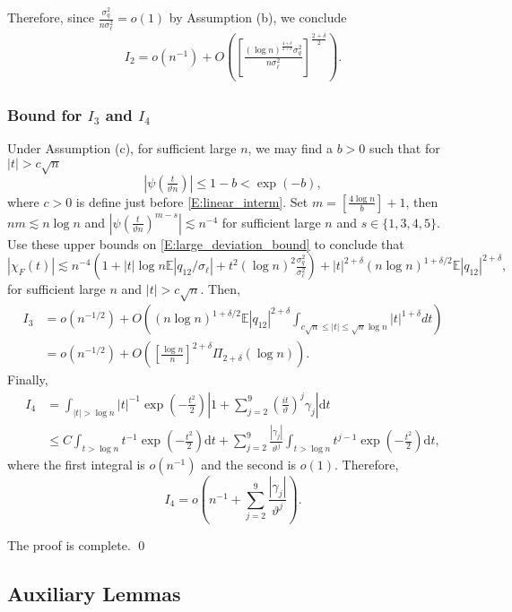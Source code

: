 \documentclass[11pt]{article}
\numberwithin{equation}{section}
\theoremstyle{definition}
\newcommand{\E}{\mathbb{E}}
\def\ls{\lesssim}
\def\d{\mathrm{d}}
\newcommand{\Scale}{\vartheta}
\begin{document}
Therefore, since $\tfrac{\sigma_q^2}{n\sigma_\ell^2} = o(1)$  by Assumption (b), we conclude
\begin{align*}
I_2 = o(n^{-1}) + O\left(\left[\frac{(\log n)^{\frac{4+\delta}{2+\delta}}\sigma_q^2}{n\sigma_\ell^2}\right]^{\tfrac{2+\delta}{2}}\right).
\end{align*}


\subsubsection*{Bound for $I_3$ and $I_4$}

Under Assumption (c),  for sufficient large $n$, we may find a $b>0$ such that for $|t|>c\sqrt{n}$
\[|\psi\left(\tfrac{t}{\Scale n}\right)|\leq 1-b<\exp(-b),\]
where $c>0$ is define just before  \eqref{E:linear_interm}. 
Set $m=[\tfrac{4\log n}{b}] + 1$, then $nm\ls n \log n$ and $|\psi\left(\tfrac{t}{\Scale n}\right)^{m-s}|\ls n^{-4}$ for sufficient large $n$ and $s\in\{1,3,4,5\}$. Use these upper bounds on \eqref{E:large_deviation_bound} to conclude that
\begin{equation} \label{E:cf_high}
|\chi_F(t)|\ls  n^{-4}\left(1 + |t|\log n \E|q_{12}/\sigma_\ell| + t^2(\log n)^2\tfrac{\sigma_q^2}{\sigma_\ell^2} \right) +  	|t|^{2+\delta}(n\log n)^{1+\delta/2}\E|q_{12}|^{2+\delta},
\end{equation}
for sufficient large $n$ and $|t|>c\sqrt{n}$. Then,
\begin{align*}
I_3&= o(n^{-1/2}) + O\left((n\log n)^{1+\delta/2}\E|q_{12}|^{2+\delta} \int_{c\sqrt{n}\leq |t|\leq \sqrt{n}\log n} |t|^{1+\delta} dt\right)\\
& =  o(n^{-1/2}) + O\left(\left[\frac{\log n}{n}\right]^{2+\delta}\Pi_{2+\delta}(\log n)\right).
\end{align*}
Finally,
\begin{align*}
   I_4&=\int_{|t|>\log n}|t|^{-1}\exp(-\tfrac{t^2}{2})\left|1 +\sum_{j=2}^9\left(\tfrac{it}{\Scale}\right)^j\gamma_j \right|\d t\\
      &\leq C \int_{t>\log n}t^{-1}\exp(-\tfrac{t^2}{2})\d t +  \sum_{j=2}^9\frac{|\gamma_j|}{\Scale^j}\int_{t>\log n}t^{j-1}\exp(-\tfrac{t^2}{2}) \d t,
\end{align*}
where the first integral is $o(n^{-1})$ and the second is $o(1)$. Therefore,
\[I_4 = o\left(n^{-1} + \sum_{j=2}^9\frac{|\gamma_j|}{\Scale^j}\right).\]

\bigskip
The proof is complete. \qed

\subsection{Auxiliary Lemmas}
\end{document}

